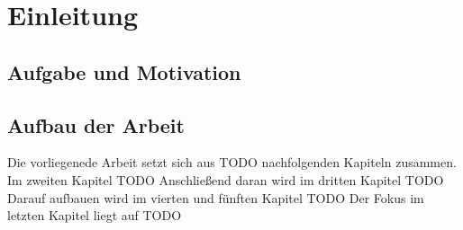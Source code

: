 \documentclass{article}
\begin{document}
    \newpage
    \tableofcontents
    \newpage
    \section{Einleitung}
    \subsection{Aufgabe und Motivation}
    \subsection{Aufbau der Arbeit}
    Die vorliegenede Arbeit setzt sich aus TODO nachfolgenden Kapiteln zusammen. 
    Im zweiten Kapitel TODO
    Anschließend daran wird im dritten Kapitel TODO
    Darauf aufbauen wird im vierten und fünften Kapitel TODO
    Der Fokus im letzten Kapitel liegt auf TODO 
    \newpage
\end{document}
